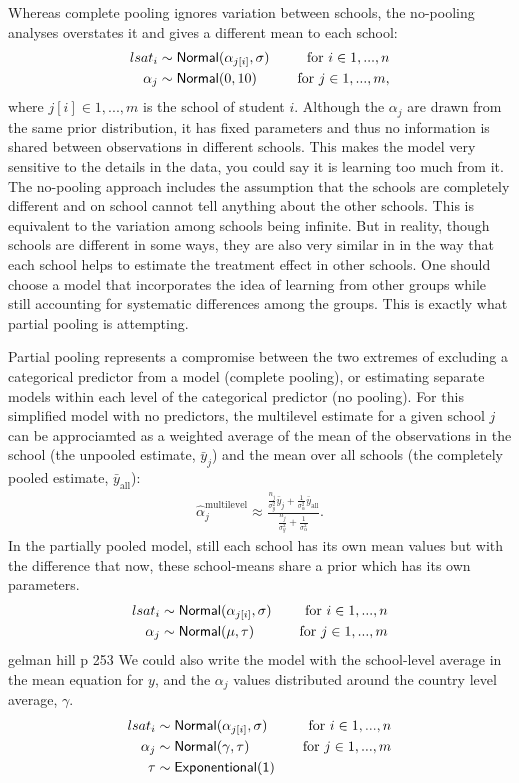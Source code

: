 \documentclass[a4, 12pt]{article}
\begin{document}
Whereas complete pooling ignores variation between schools, the no-pooling analyses overstates it and gives a different mean to each school:
\begin{align*}
lsat_i & \sim {\sf Normal} (\alpha_{j[i]}, \sigma) & \quad \text{for } i \in 1,...,n \\
\alpha_{j} & \sim {\sf Normal} (0, 10) & \quad \text{for } j \in 1,...,m,
\end{align*}
where \(j[i] \in 1,...,m\) is the school of student \(i\).
Although the \(\alpha_j\) are drawn from the same prior distribution, it has fixed parameters and thus no information is shared between observations in different schools. This makes the model very sensitive to the details in the data, you could say it is learning too much from it. The no-pooling approach includes the assumption that the schools are completely different and on school cannot tell anything about the other schools. This is equivalent to the variation among schools being infinite. But in reality, though schools are different in some ways, they are also very similar in in the way that each school helps to estimate the treatment effect in other schools. One should choose a model that incorporates the idea of learning from other groups while still accounting for systematic differences among the groups. This is exactly what partial pooling is attempting.

Partial pooling represents a compromise between the two extremes of excluding a categorical predictor from a model (complete pooling), or estimating separate models within each level of the categorical predictor (no pooling). For this simplified model with no predictors, the multilevel estimate for a given school \(j\) can be approciamted as a weighted average of the mean of the observations in the school (the unpooled estimate, \(\bar{y}_j\)) and the mean over all schools (the completely pooled estimate, \(\bar{y}_{\mathrm {all}}\)):
\begin{align*}
\hat{\alpha}_j^{\mathrm {multilevel}} \approx \frac {\frac{n_j}{\sigma_y^2}\bar y_j + \frac {1}{\sigma_{\alpha}^2}\bar y_{\mathrm {all}}}{\frac {n_j}{\sigma_y^2} + \frac {1}{\sigma_{\alpha}^2}}.
\end{align*}
In the partially pooled model, still each school has its own mean values but with the difference that now, these school-means share a prior which has its own parameters.
\begin{align*}
lsat_i & \sim {\sf Normal} (\alpha_{j[i]}, \sigma) & \quad \text{for } i \in 1,...,n \\
\alpha_{j} & \sim {\sf Normal} (\mu, \tau) & \quad \text{for } j \in 1,...,m
\end{align*} gelman hill p 253
We could also write the model with the school-level average in the mean equation for \(y\), and the \(\alpha_j\) values distributed around the country level average, \(\gamma\).
\begin{align*}
lsat_i & \sim {\sf Normal} (\alpha_{j[i]}, \sigma) & \quad \text{for } i \in 1,...,n \\
\alpha_{j} & \sim {\sf Normal} (\gamma, \tau) & \quad \text{for } j \in 1,...,m \\
\tau & \sim {\sf Exponentional(1)}
\end{align*}
\end{document}
